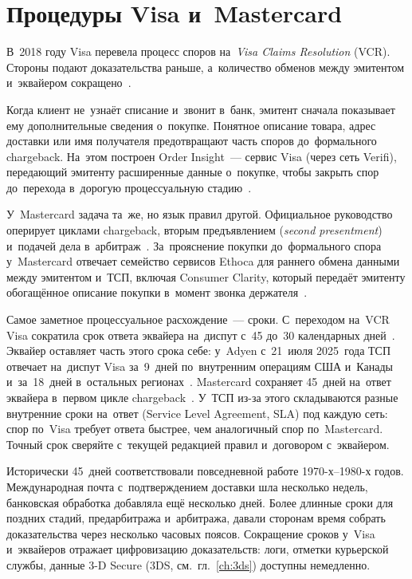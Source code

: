 \section{Процедуры Visa и~Mastercard}\label{sec:disputes-vcr-mc}

В~2018 году Visa перевела процесс споров на~\emph{Visa Claims Resolution}
(VCR). Стороны подают доказательства раньше, а~количество обменов между
эмитентом и~эквайером сокращено~\cite{visa-vcr-merchants,visa-core-rules}.

Когда клиент не~узнаёт списание и~звонит в~банк, эмитент сначала показывает
ему дополнительные сведения о~покупке. Понятное описание товара, адрес доставки
или имя получателя предотвращают часть споров до~формального chargeback.
На~этом построен Order Insight~--- сервис Visa (через сеть Verifi), передающий
эмитенту расширенные данные о~покупке, чтобы закрыть спор до~перехода в~дорогую
процессуальную стадию~\cite{visa-order-insight}.

У~Mastercard задача та~же, но язык правил другой. Официальное руководство
оперирует циклами chargeback, вторым предъявлением (\textit{second
presentment}) и~подачей дела в~арбитраж~\cite{mc-chargeback-guide}. За~прояснение покупки
до~формального спора у~Mastercard отвечает семейство сервисов Ethoca для раннего
обмена данными между эмитентом и~ТСП, включая Consumer Clarity, который передаёт
эмитенту обогащённое описание покупки в~момент звонка
держателя~\cite{mc-dispute-management,mc-ethoca-consumer-clarity}.

Самое заметное процессуальное расхождение~--- сроки. С~переходом на~VCR Visa
сократила срок ответа эквайера на~диспут с~45 до~30 календарных
дней~\cite{visa-vcr-merchants,visa-core-rules}. Эквайер оставляет часть этого срока
себе: у~Adyen с~21~июля 2025~года ТСП отвечает на~диспут Visa за~9~дней
по~внутренним операциям США и~Канады и~за~18~дней в~остальных
регионах~\cite{adyen-dispute-timeframes}. Mastercard сохраняет 45~дней на~ответ эквайера
в~первом цикле chargeback~\cite{mc-chargeback-guide}. У~ТСП из-за
этого складываются разные внутренние сроки на~ответ (Service Level Agreement,
SLA) под каждую сеть: спор по~Visa требует ответа быстрее, чем аналогичный
спор по~Mastercard. Точный срок сверяйте с~текущей редакцией правил и~договором
с~эквайером.

Исторически 45~дней соответствовали повседневной работе 1970-х--1980-х годов.
Международная почта с~подтверждением доставки шла несколько недель, банковская
обработка добавляла ещё несколько дней. Более длинные сроки для поздних стадий,
предарбитража и~арбитража, давали сторонам время собрать доказательства через
несколько часовых поясов. Сокращение сроков у~Visa и~эквайеров отражает цифровизацию
доказательств: логи, отметки курьерской службы, данные 3-D Secure (3DS,
см.~гл.~\ref{ch:3ds}) доступны немедленно.

